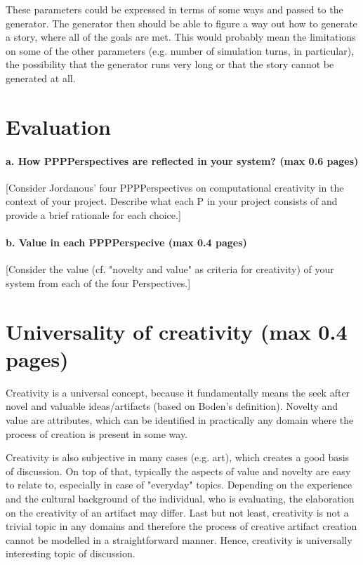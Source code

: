 \documentclass[english]{tktltiki}
\begin{document}
    These parameters could be expressed in terms of some ways and passed to the generator. The generator then should be able to figure a way out how to generate a story, where all of the goals are met. This would probably mean the limitations on some of the other parameters (e.g. number of simulation turns, in particular), the possibility that the generator runs very long or that the story cannot be generated at all.

    \pagebreak
    \section{Evaluation}
    
    \paragraph{a. How PPPPerspectives are reflected in your system? (max 0.6 pages)}
    
    [Consider Jordanous' four PPPPerspectives on computational creativity in the context of your project. Describe what each P in your project consists of and provide a brief rationale for each choice.]
    
    \paragraph{b. Value in each PPPPerspecive (max 0.4 pages) }
    
    [Consider the value (cf. "novelty and value" as criteria for creativity) of your system from each of the four Perspectives.]
    
    \pagebreak
    \section{Universality of creativity (max 0.4 pages)}
    Creativity is a universal concept, because it fundamentally means the seek after novel and valuable ideas/artifacts (based on Boden's definition). Novelty and value are attributes, which can be identified in practically any domain where the process of creation is present in some way. 
    
    Creativity is also subjective in many cases (e.g. art), which creates a good basis of discussion. On top of that, typically the aspects of value and novelty are easy to relate to, especially in case of "everyday" topics. Depending on the experience and the cultural background of the individual, who is evaluating, the elaboration on the creativity of an artifact may differ. Last but not least, creativity is not a trivial topic in any domains and therefore the process of creative artifact creation cannot be modelled in a straightforward manner. Hence, creativity is universally interesting topic of discussion.
    
\end{document}
